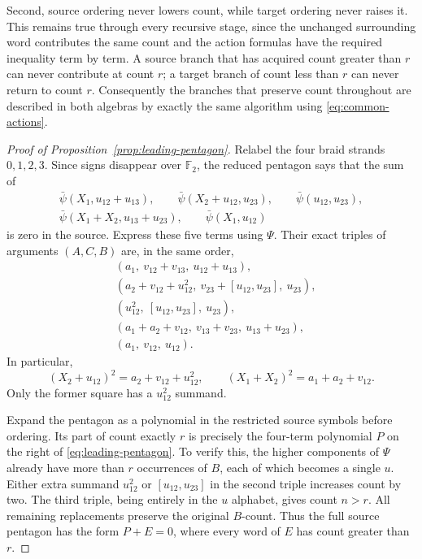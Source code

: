\documentclass[11pt]{article}
\newcommand{\F}{{\mathbb F_2}}
\theoremstyle{definition}
\theoremstyle{remark}
\numberwithin{equation}{section}
\begin{document}
Second, source ordering never lowers count, while target ordering
never raises it.  This remains true through every recursive stage,
since the unchanged surrounding word contributes the same count
and the action formulas have the required inequality term by term.
A source branch that has acquired count greater than $r$ can never
contribute at count $r$; a target branch of count less than $r$ can
never return to count $r$.  Consequently the branches that preserve
count throughout are described in both algebras by exactly the same
algorithm using \eqref{eq:common-actions}.

\begin{proof}[Proof of Proposition~\ref{prop:leading-pentagon}]
Relabel the four braid strands $0,1,2,3$.  Since signs disappear over
$\F$, the reduced pentagon says that the sum of
\[
 \begin{gathered}
 \bar\psi(X_1,u_{12}+u_{13}),\qquad
 \bar\psi(X_2+u_{12},u_{23}),\qquad
 \bar\psi(u_{12},u_{23}),\\
 \bar\psi(X_1+X_2,u_{13}+u_{23}),\qquad
 \bar\psi(X_1,u_{12})
 \end{gathered}
\]
is zero in the source.  Express these five terms using $\Psi$.
Their exact triples of arguments $(A,C,B)$ are, in the same order,
\begin{equation}\label{eq:five-substitutions}
\begin{aligned}
 &(a_1,\ v_{12}+v_{13},\ u_{12}+u_{13}),\\
 &(a_2+v_{12}+u_{12}^2,\ v_{23}+[u_{12},u_{23}],\ u_{23}),\\
 &(u_{12}^2,\ [u_{12},u_{23}],\ u_{23}),\\
 &(a_1+a_2+v_{12},\ v_{13}+v_{23},\ u_{13}+u_{23}),\\
 &(a_1,\ v_{12},\ u_{12}).
\end{aligned}
\end{equation}
In particular,
\[
 (X_2+u_{12})^2=a_2+v_{12}+u_{12}^2,
 \qquad (X_1+X_2)^2=a_1+a_2+v_{12}.
\]
Only the former square has a $u_{12}^2$ summand.

Expand the pentagon as a polynomial in the restricted source symbols
before ordering.  Its part of count exactly $r$ is precisely the
four-term polynomial $P$ on the right of
\eqref{eq:leading-pentagon}.  To verify this, the higher components
of $\Psi$ already have more than $r$ occurrences of $B$, each of
which becomes a single $u$.  Either extra summand $u_{12}^2$ or
$[u_{12},u_{23}]$ in the second triple increases count by two.
The third triple, being entirely in the $u$ alphabet, gives count
$n>r$.  All remaining replacements preserve the original $B$-count.
Thus the full source pentagon has the form $P+E=0$, where every word
of $E$ has count greater than $r$.


\end{proof}
\end{document}
